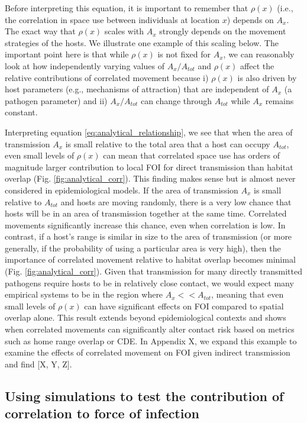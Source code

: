 \documentclass[letterpaper]{article}
\begin{document}
Before interpreting this equation, it is important to remember that $\rho(x)$ (i.e., the correlation in space use between individuals at location $x$) depends on $A_x$. The exact way that $\rho(x)$ scales with $A_x$ strongly depends on the movement strategies of the hosts. We illustrate one example of this scaling below. The important point here is that while $\rho(x)$ is not fixed for $A_x$, we can reasonably look at how independently varying values of $A_x / A_{tot}$ and $\rho(x)$ affect the relative contributions of correlated movement because i) $\rho(x)$ is also driven by host parameters (e.g., mechanisms of attraction) that are independent of $A_x$ (a pathogen parameter) and ii) $A_x / A_{tot}$ can change through $A_{tot}$ while $A_{x}$ remains constant.

Interpreting equation \ref{eq:analytical_relationship}, we see that when the area of transmission $A_x$ is small relative to the total area that a host can occupy $A_{tot}$, even small levels of $\rho(x)$ can mean that correlated space use has orders of magnitude larger contribution to local FOI for direct transmission than habitat overlap (Fig. \ref{fig:analytical_corr}). This finding makes sense but is almost never considered in epidemiological models. If the area of transmission $A_x$ is small relative to $A_{tot}$ and hosts are moving randomly, there is a very low chance that hosts will be in an area of transmission together at the same time. Correlated movements significantly increase this chance, even when correlation is low. In contrast, if a host's range is similar in size to the area of transmission (or more generally, if the probability of using a particular area is very high), then the importance of correlated movement relative to habitat overlap becomes minimal (Fig. \ref{fig:analytical_corr}).  Given that transmission for many directly transmitted pathogens require hosts to be in relatively close contact, we would expect many empirical systems to be in the region where $A_x << A_{tot}$, meaning that even small levels of $\rho(x)$ can have significant effects on FOI compared to spatial overlap alone. This result extends beyond epidemiological contexts and shows when correlated movements can significantly alter contact risk based on metrics such as home range overlap or CDE. In Appendix X, we expand this example to examine the effects of correlated movement on FOI given indirect transmission and find [X, Y, Z].

\subsection*{Using simulations to test the contribution of correlation to force of infection}
\end{document}
